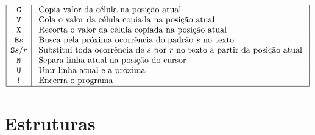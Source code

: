 \documentclass[a4paper, 11pt]{article}
\begin{document}
$$\begin{array}{|c|l|}
\texttt{ C } & \text { Copia valor da célula na posição atual } \\
\texttt{ V } & \text { Cola o valor da célula copiada na posição atual  } \\
\texttt{ X } & \text { Recorta o valor da célula copiada na posição atual } \\
\texttt{B}s & \text { Busca pela próxima ocorrência do padrão } s \text { no texto } \\
\texttt{S}s/r & \text { Substitui toda ocorrência de } s \text { por } r \text { no texto a partir da posição atual } \\
\texttt{ N } & \text { Separa linha atual na posição do cursor } \\
\texttt{ U } & \text { Unir linha atual e a próxima } \\
\texttt{!} & \text { Encerra o programa } \\
\hline
\end{array}
$$

\tableofcontents

\section{Estruturas}
\end{document}
